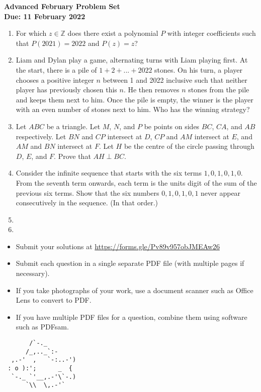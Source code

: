 \documentclass{article}
\begin{document}
\thispagestyle{empty}

\begin{center}
  \textbf{\Large Advanced February Problem Set}
  \\ \vspace{1em}
  \textbf{\large Due: 11 February 2022}
\end{center}

\bigskip

\begin{enumerate}[itemsep=\fill]

\item %
For which $z \in \mathbb{Z}$ does there exist a polynomial $P$ with integer coefficients such that $P(2021) = 2022$ and $P(z) = z$?


\item %
Liam and Dylan play a game, alternating turns with Liam playing first.
At the start, there is a pile of $1+2+...+2022$ stones.
On his turn, a player chooses a positive integer $n$ between 1 and 2022 inclusive such that neither player has previously chosen this $n$.
He then removes $n$ stones from the pile and keeps them next to him.
Once the pile is empty, the winner is the player with an even number of stones next to him.
Who has the winning strategy? 


\item %
Let $ABC$ be a triangle.
Let $M$, $N$, and $P$ be points on sides $BC$, $CA$, and $AB$ respectively.
Let $BN$ and $CP$ intersect at $D$, $CP$ and $AM$ intersect at $E$, and $AM$ and $BN$ intersect at $F$.
Let $H$ be the centre of the circle passing through $D$, $E$, and $F$.
Prove that $AH \perp BC$.


\item %
Consider the infinite sequence that starts with the six terms $1, 0, 1, 0, 1, 0$. From the seventh term onwards, each term is the units digit of the sum of the previous six terms. Show that the six numbers $0, 1, 0, 1, 0, 1$ never appear consecutively in the sequence. (In that order.)


\item %


\item %

\end{enumerate}


\vfill
\small
\begin{itemize}
	\item Submit your solutions at \href{https://forms.gle/Pv89v957obJMEAw26}{https://forms.gle/Pv89v957obJMEAw26}
	\item Submit each question in a single separate PDF file (with multiple pages if necessary).
	\item If you take photographs of your work, use a document scanner such as Office Lens to convert to PDF.
	\item If you have multiple PDF files for a question, combine them using software such as PDFsam.
\end{itemize}

\vfill
\centering
\small
\begin{BVerbatim}
       /`-._
      /_,.._`:-         
  ,.-'  ,   `-:..-')   
 : o ):';      _  {   
  `-._ `'__,.-'\`-.)
      `\\  \,.-'`
\end{BVerbatim}
\end{document}
